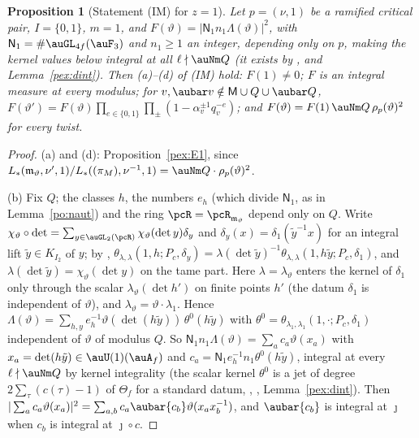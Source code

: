 \documentclass[10pt]{amsart}
\newtheorem{proposition}[theorem]{Proposition}
\theoremstyle{definition}
\theoremstyle{remark}
\begin{document}
\begin{proposition}[Statement (IM) for $z=1$]\label{pex:IM1}
Let $p=(\nu,1)$ be a ramified critical pair, $I=\{0,1\}$, $m=1$, and $F(\vartheta)=|\mathsf N_1n_1
\Lambda(\vartheta)|^2$, with $\mathsf N_1=\#\auGL_{4f}(\auF_3)$ and $n_1\ge1$ an integer, depending only on $p$, making the kernel values below integral at all
$\ell\nmid\auNm Q$ (it exists by {\cite[Proposition~5.30]{P49}}, {\cite[Corollary~7.16]{P49}} and Lemma~\ref{pex:dint}). Then {\rm(a)}--{\rm(d)}
of {\rm(IM)} hold: $F(1)\ne0$; $F$ is an integral measure at every modulus; for $v,\aubar v\notin\mathsf M
\cup Q\cup\aubar Q$, $F(\vartheta')=F(\vartheta)\prod_{e\in\{0,1\}}\prod_\pm(1-\alpha_v^{\pm1}q_v^{-e})$; and
$F(\vartheta)=F(1)\,\auNm Q\,\rho_p(\vartheta)^2$ for every twist.
\end{proposition}
\begin{proof}
(a) and (d): Proposition~\ref{pex:E1}, since $L_*(\mathfrak m_\vartheta,\nu',1)/L_*((\pi_M),\nu^{-1},1)=
\auNm Q\cdot\rho_p(\vartheta)^2$.

(b) Fix $Q$; the classes $h$, the numbers $e_h$ (which divide $\mathsf N_1$, as in Lemma~\ref{po:naut})
and the ring $\pcR=\pcR_{\mathfrak m_\vartheta}$ depend only on $Q$. Write $\chi_\vartheta\circ\det=\sum_{y\in
\auGL_2(\pcR)}\chi_\vartheta(\det y)\delta_y$ and $\delta_y(x)=\delta_1(\tilde y^{-1}x)$ for an integral lift
$\tilde y\in K_{I_2}$ of $y$; by {\cite[Lemma~2.9]{P53}}, $\theta_{\lambda,\lambda}(1,h;P_c,\delta_y)=
\lambda(\det\tilde y)^{-1}\theta_{\lambda,\lambda}(1,h\tilde y;P_c,\delta_1)$, and $\lambda(\det\tilde y)=
\chi_\vartheta(\det y)$ on the tame part. Here $\lambda=\lambda_\vartheta$ enters the kernel of $\delta_1$
only through the scalar $\lambda_\vartheta(\det h')$ on finite points $h'$ (the datum $\delta_1$ is
independent of $\vartheta$), and $\lambda_\vartheta=\vartheta\cdot\lambda_1$. Hence
$\Lambda(\vartheta)=\sum_{h,y}e_h^{-1}\vartheta(\det(h\tilde y))\,\theta^0(h\tilde y)$ with
$\theta^0=\theta_{\lambda_1,\lambda_1}(1,\cdot;P_c,\delta_1)$ independent of $\vartheta$ of modulus $Q$. So
$\mathsf N_1n_1\Lambda(\vartheta)=\sum_ac_a\vartheta(x_a)$ with $x_a=\det(h\tilde y)\in\auU(1)(\auA_f)$ and
$c_a=\mathsf N_1e_h^{-1}n_1\theta^0(h\tilde y)$, integral at every $\ell\nmid\auNm Q$ by kernel integrality
(the scalar kernel $\theta^0$ is a jet of degree $2\sum_\tau(c(\tau)-1)$ of $\Theta_f$ for a standard
datum, {\cite[Proposition~5.30]{P49}}, {\cite[Corollary~7.16]{P49}}, Lemma~\ref{pex:dint}). Then $|\sum_ac_a\vartheta
(x_a)|^2=\sum_{a,b}c_a\aubar{c_b}\vartheta(x_ax_b^{-1})$, and $\aubar{c_b}$ is integral at $\jmath$ when
$c_b$ is integral at $\jmath\circ c$.


\end{proof}
\end{document}
